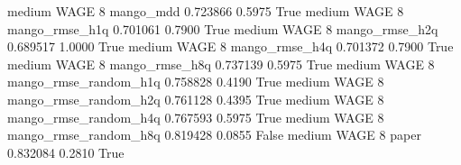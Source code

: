     medium     WAGE                 8             mango_mdd   0.723866      0.5975    True
    medium     WAGE                 8        mango_rmse_h1q   0.701061      0.7900    True
    medium     WAGE                 8        mango_rmse_h2q   0.689517      1.0000    True
    medium     WAGE                 8        mango_rmse_h4q   0.701372      0.7900    True
    medium     WAGE                 8        mango_rmse_h8q   0.737139      0.5975    True
    medium     WAGE                 8 mango_rmse_random_h1q   0.758828      0.4190    True
    medium     WAGE                 8 mango_rmse_random_h2q   0.761128      0.4395    True
    medium     WAGE                 8 mango_rmse_random_h4q   0.767593      0.5975    True
    medium     WAGE                 8 mango_rmse_random_h8q   0.819428      0.0855   False
    medium     WAGE                 8                 paper   0.832084      0.2810    True
